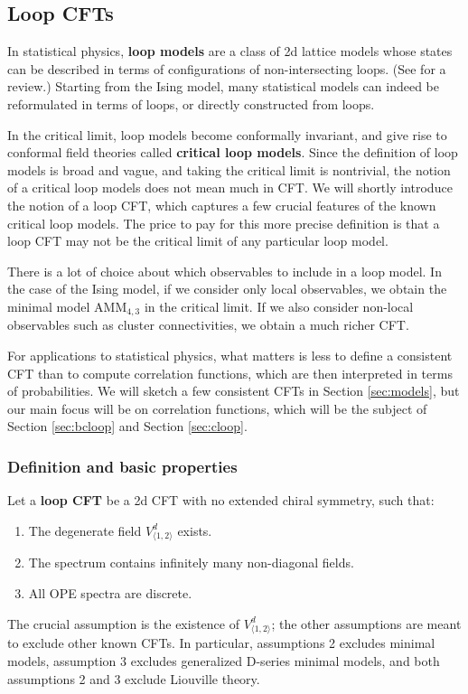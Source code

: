 \documentclass[12pt, a4paper]{article}
\begin{document}
\subsection{Loop CFTs}

In statistical physics, \textbf{loop models} are a class of 2d lattice models whose states can be described in terms of configurations of non-intersecting loops. (See \cite{jac09} for a review.) Starting from the Ising model, many statistical models can indeed be reformulated in terms of loops, or directly constructed from loops.

In the critical limit, loop models become conformally invariant, and give rise to conformal field theories called \textbf{critical loop models}. Since the definition of loop models is broad and vague, and taking the critical limit is nontrivial, the notion of a critical loop models does not mean much in CFT. We will shortly introduce the notion of a loop CFT, which captures a few crucial features of the known critical loop models. The price to pay for this more precise definition is that a loop CFT may not be the critical limit of any particular loop model.

There is a lot of choice about which observables to include in a loop model. In the case of the Ising model, if we consider only local observables, we obtain the minimal model $\text{AMM}_{4,3}$ in the critical limit. If we also consider non-local observables such as cluster connectivities, we obtain a much richer CFT.

For applications to statistical physics, what matters is less to define a consistent CFT than to compute correlation functions, which are then interpreted in terms of probabilities. We will sketch a few consistent CFTs in Section \ref{sec:models}, but our main focus will be on correlation functions, which will be the subject of Section \ref{sec:bcloop} and Section \ref{sec:cloop}.

\subsubsection{Definition and basic properties}

Let a \textbf{loop CFT} be a 2d CFT with no extended chiral symmetry, such that:
\begin{enumerate}
 \item The degenerate field $V^d_{\langle 1,2\rangle}$ exists.
 \item The spectrum contains infinitely many non-diagonal fields.
 \item All OPE spectra are discrete.
\end{enumerate}
The crucial assumption is the existence of $V^d_{\langle 1,2\rangle}$; the other assumptions are meant to exclude other known CFTs. In particular, assumptions 2 excludes minimal models, assumption 3 excludes generalized D-series minimal models, and both assumptions 2 and 3 exclude Liouville theory.
\end{document}

